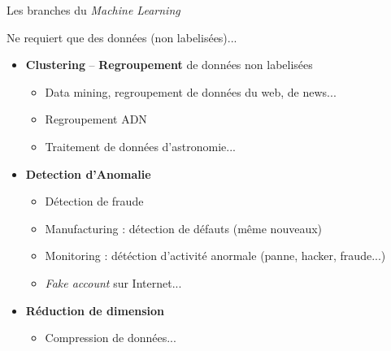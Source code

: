 \documentclass[10pt,serif,mathserif,compress,hyperref={colorlinks}]{beamer}
\begin{document}
\begin{frame}{Les branches du {\em Machine Learning}}
  \begin{tcolorbox}[title={\em Unsupervised learning}\\Apprentissage non-supervisé]
    Ne requiert que des données (non labelisées)...
    \begin{itemize}
    \item \textbf{Clustering} -- \textbf{Regroupement} de données non labelisées 
      \begin{itemize}
      \item Data mining, regroupement de données du web, de news...
      \item Regroupement ADN
      \item Traitement de données d'astronomie...
      \end{itemize}        
    \item \textbf{Detection d'Anomalie}
      \begin{itemize}
      \item Détection de fraude
      \item Manufacturing : détection de défauts (même nouveaux)
      \item Monitoring : détéction d'activité anormale (panne, hacker, fraude...)
      \item {\em Fake account} sur Internet...
      \end{itemize}
    \item \textbf{Réduction de dimension}
      \begin{itemize}
      \item Compression de données...
      \end{itemize}
    \end{itemize}
  \end{tcolorbox}    
\end{frame}
\end{document}
